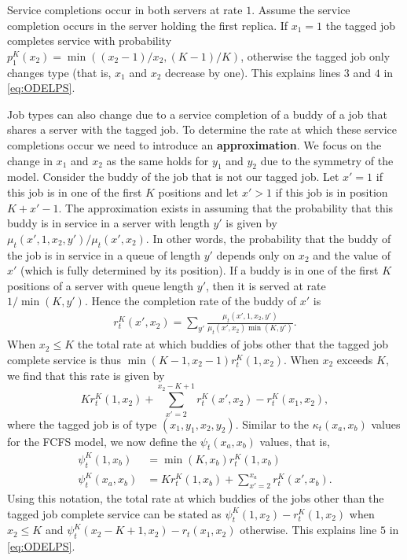 \documentclass[acmsmall,nonacm]{acmart}
\begin{document}
Service completions occur in both servers at rate $1$. Assume the service completion
occurs in the server holding the first replica. If $x_1=1$ the tagged job completes service
with probability $p^K_1(x_2)=\min((x_2-1)/x_2,(K-1)/K)$, otherwise the tagged job only changes
type (that is, $x_1$ and $x_2$ decrease by one). This explains lines $3$ and $4$ in \eqref{eq:ODELPS}.

Job types can also change due to a service completion of a buddy of a job that shares a 
server with the tagged job. To determine the rate at which these service completions occur
we need to introduce an {\bf approximation}. We focus on the change in $x_1$ and $x_2$ as the
same holds for $y_1$ and $y_2$ due to the symmetry of the model. Consider the buddy of the job
that is not our tagged job.  Let $x'= 1$ if this job is in one of the first $K$ positions 
and let $x'>1$ if this job is in position $K+x'-1$. The approximation exists in assuming that the probability that this buddy is in service in a server with length $y'$ is given by 
$\mu_t(x',1,x_2,y')/\mu_t(x',x_2)$. In other words, the probability that the buddy of the job  is in service in a queue of length $y'$ depends only on $x_2$ and the value of $x'$ (which is fully determined by its
position). If a buddy is in one of the first $K$ positions of a server with queue length $y'$,
then it is served at rate $1/\min(K,y')$. Hence the completion rate of the buddy of $x'$ is
\begin{align}\label{eq:buddyrate}
    r_t^K(x',x_2) = \sum_{y'} \frac{\mu_t(x',1,x_2,y')}{\mu_t(x',x_2) \min(K,y')}.
\end{align} When $x_2 \leq K$ the total rate at which buddies of jobs other that the tagged job complete
service is thus $\min(K-1,x_2-1)r_t^K(1,x_2)$. When $x_2$ exceeds $K$, we find
that this rate is given by
\[ K r_t^K(1,x_2) + \sum_{x'=2}^{x_2-K+1} r_t^K(x',x_2) - r_t^K(x_1,x_2),\]
where the tagged job is of type $(x_1,y_1,x_2,y_2)$.
Similar to the $\kappa_t(x_a,x_b)$ values for the FCFS model, we now define the $\psi_t(x_a,x_b)$
values, that is,
\begin{align}
    \psi^K_t(1,x_b) &= \min(K,x_b) r_t^K(1,x_b) \\
     \psi^K_t(x_a,x_b) &= K r_t^K(1,x_b) + \sum_{x'=2}^{x_a} r_t^K(x',x_b). 
\end{align}
Using this notation, the total rate at which buddies of the jobs other than the tagged job
complete service can be stated as
$\psi^K_t(1,x_2) - r_t^K(1,x_2)$ when $x_2 \leq K$ and $\psi^K_t(x_2-K+1,x_2)-r_t(x_1,x_2)$
otherwise. This explains line $5$ in \eqref{eq:ODELPS}.
\end{document}
